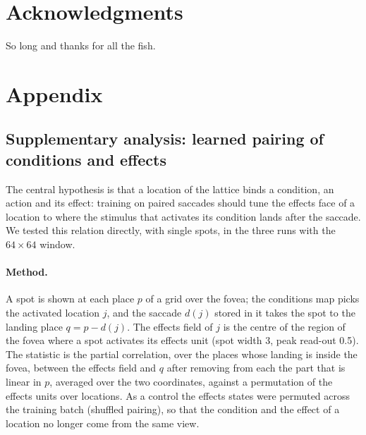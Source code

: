 \documentclass[14pt]{article}
\begin{document}

\section*{Acknowledgments} %


So long and thanks for all the fish.

\section{Appendix}
\subsection{Supplementary analysis: learned pairing of conditions and effects}
\label{sec:supp-pairing}

The central hypothesis is that a location of the lattice binds a condition, an action and its effect: training on paired saccades should tune the effects face of a location to where the stimulus that activates its condition lands after the saccade.
We tested this relation directly, with single spots, in the three runs with the $64\times64$ window.

\paragraph{Method.}
A spot is shown at each place $p$ of a grid over the fovea; the conditions map picks the activated location $j$, and the saccade $d(j)$ stored in it takes the spot to the landing place $q=p-d(j)$.
The effects field of $j$ is the centre of the region of the fovea where a spot activates its effects unit (spot width 3, peak read-out 0.5).
The statistic is the partial correlation, over the places whose landing is inside the fovea, between the effects field and $q$ after removing from each the part that is linear in $p$, averaged over the two coordinates, against a permutation of the effects units over locations.
As a control the effects states were permuted across the training batch (shuffled pairing), so that the condition and the effect of a location no longer come from the same view.
\end{document}
